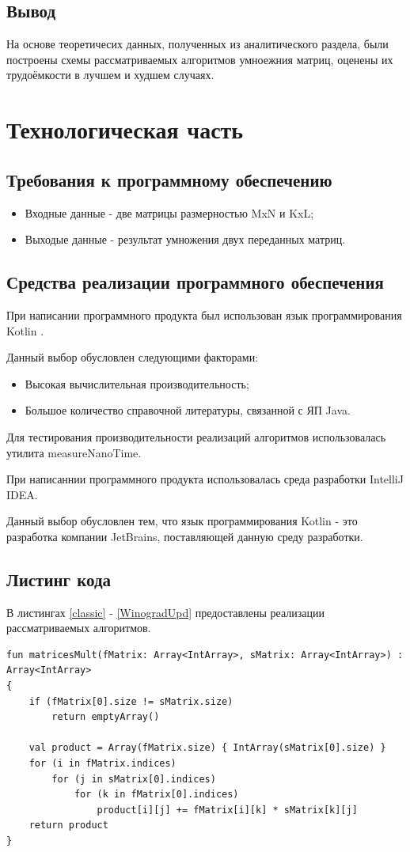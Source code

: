 \documentclass[12pt]{report}
\begin{document}
\section*{Вывод}
На основе теоретичесих данных, полученных из аналитического раздела, были построены схемы рассматриваемых алгоритмов умноежния матриц, оценены их трудоёмкости в лучшем и худшем случаях.

\chapter{Технологическая часть}
\section{Требования к программному обеспечению}
\begin{itemize}
\item Входные данные - две матрицы размерностью MxN и KxL;
\item Выходые данные - результат умножения двух переданных матриц.
\end{itemize}
\section{Средства реализации программного обеспечения}
При написании программного продукта был использован язык программирования Kotlin \cite{Kotlin}.

Данный выбор обусловлен следующими факторами:
\begin{itemize}
\item Высокая вычислительная производительность;
\item Большое количество справочной литературы, связанной с ЯП Java.
\end{itemize}

Для тестирования производительности реализаций алгоритмов использовалась утилита measureNanoTime.

При написаннии программного продукта использовалась среда разработки IntelliJ IDEA.

Данный выбор обусловлен тем, что язык программирования Kotlin - это разработка компании JetBrains, поставляющей данную среду разработки.

\section{Листинг кода}
В листингах \ref{classic} - \ref{WinogradUpd} предоставлены реализации рассматриваемых алгоритмов.
\begin{lstlisting}[caption=Функция реализации алгоритма классического умножения матриц,
label={classic}]
fun matricesMult(fMatrix: Array<IntArray>, sMatrix: Array<IntArray>) : Array<IntArray>
{
    if (fMatrix[0].size != sMatrix.size)
        return emptyArray()

    val product = Array(fMatrix.size) { IntArray(sMatrix[0].size) }
    for (i in fMatrix.indices)
        for (j in sMatrix[0].indices)
            for (k in fMatrix[0].indices)
                product[i][j] += fMatrix[i][k] * sMatrix[k][j]
    return product
}
\end{lstlisting}
\end{document}
